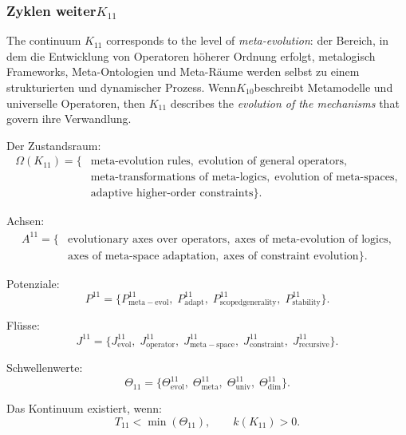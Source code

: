 
\subsubsection{Zyklen weiter$K_{11}$}
\label{sec:cycles-k11}

The continuum $K_{11}$ corresponds to the level of \emph{meta-evolution}:
der Bereich, in dem die Entwicklung von Operatoren höherer Ordnung erfolgt, metalogisch
Frameworks, Meta-Ontologien und Meta-Räume werden selbst zu einem strukturierten und
dynamischer Prozess. Wenn$K_{10}$beschreibt Metamodelle und universelle Operatoren,
then $K_{11}$ describes the \emph{evolution of the mechanisms} that govern
ihre Verwandlung.

Der Zustandsraum:
\[
  \begin{aligned}
  \Omega(K_{11})
  = \{&
    \text{meta-evolution rules},\;
    \text{evolution of general operators},\\
    &\text{meta-transformations of meta-logics},\;
    \text{evolution of meta-spaces},\\
    &\text{adaptive higher-order constraints}
  \}.
  \end{aligned}
\]

Achsen:
\[
  \begin{aligned}
A^{11}
  = \{&
      \text{evolutionary axes over operators},\;
      \text{axes of meta-evolution of logics},\\
      &\text{axes of meta-space adaptation},\;
      \text{axes of constraint evolution}
    \}.
  \end{aligned}
\]

Potenziale:
\[
P^{11}
  = \{
      P^{11}_{\mathrm{meta\!-\!evol}},\;
      P^{11}_{\mathrm{adapt}},\;
      P^{11}_{\mathrm{scoped generality}},\;
      P^{11}_{\mathrm{stability}}
    \}.
\]

Flüsse:
\[
J^{11}
  = \{
      J^{11}_{\mathrm{evol}},\;
      J^{11}_{\mathrm{operator}},\;
      J^{11}_{\mathrm{meta\!-\!space}},\;
      J^{11}_{\mathrm{constraint}},\;
      J^{11}_{\mathrm{recursive}}
    \}.
\]

Schwellenwerte:
\[
  \Theta_{11}
   =
   \{
     \Theta^{11}_{\mathrm{evol}},\;
     \Theta^{11}_{\mathrm{meta}},\;
     \Theta^{11}_{\mathrm{univ}},\;
     \Theta^{11}_{\mathrm{dim}}
   \}.
\]

Das Kontinuum existiert, wenn:
\[
  T_{11} < \min(\Theta_{11}), \qquad k(K_{11})>0.
\]


